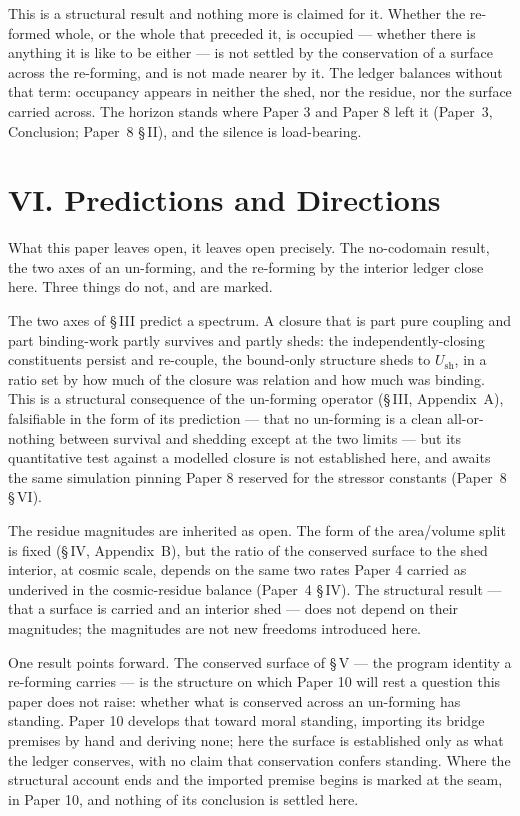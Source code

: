 \documentclass[11pt,oneside]{report}
\theoremstyle{definition}
\theoremstyle{remark}
\begin{document}
This is a structural result and nothing more is claimed for it. Whether the re-formed whole, or the
whole that preceded it, is occupied --- whether there is anything it is like to be either --- is not
settled by the conservation of a surface across the re-forming, and is not made nearer by it. The
ledger balances without that term: occupancy appears in neither the shed, nor the residue, nor the
surface carried across. The horizon stands where Paper 3 and Paper 8 left it (Paper~3, Conclusion;
Paper~8 \S\,II), and the silence is load-bearing.

\section*{VI. Predictions and Directions}

What this paper leaves open, it leaves open precisely. The no-codomain result, the two axes of an
un-forming, and the re-forming by the interior ledger close here. Three things do not, and are
marked.

The two axes of \S\,III predict a spectrum. A closure that is part pure coupling and part
binding-work partly survives and partly sheds: the independently-closing constituents persist and
re-couple, the bound-only structure sheds to \ensuremath{U_{\mathrm{sh}}}, in a ratio set by how
much of the closure was relation and how much was binding. This is a structural consequence of the
un-forming operator (\S\,III, Appendix~A), falsifiable in the form of its prediction --- that no
un-forming is a clean all-or-nothing between survival and shedding except at the two limits --- but
its quantitative test against a modelled closure is not established here, and awaits the same
simulation pinning Paper 8 reserved for the stressor constants (Paper~8 \S\,VI).

The residue magnitudes are inherited as open. The form of the area/volume split is fixed (\S\,IV,
Appendix~B), but the ratio of the conserved surface to the shed interior, at cosmic scale, depends
on the same two rates Paper 4 carried as underived in the cosmic-residue balance (Paper~4 \S\,IV).
The structural result --- that a surface is carried and an interior shed --- does not depend on
their magnitudes; the magnitudes are not new freedoms introduced here.

One result points forward. The conserved surface of \S\,V --- the program identity a re-forming
carries --- is the structure on which Paper 10 will rest a question this paper does not raise:
whether what is conserved across an un-forming has standing. Paper 10 develops that toward moral
standing, importing its bridge premises by hand and deriving none; here the surface is established
only as what the ledger conserves, with no claim that conservation confers standing. Where the
structural account ends and the imported premise begins is marked at the seam, in Paper 10, and
nothing of its conclusion is settled here.
\end{document}
